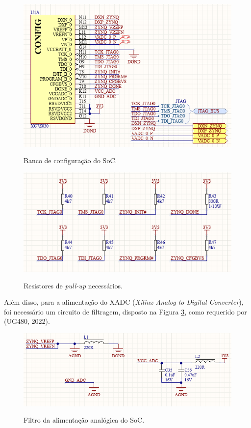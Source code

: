\begin{figure}[H]
    \centering
    \caption{Banco de configuração do SoC.}
    \includegraphics[scale=0.8]{images/zynqconfig.png}
    \label{fig:config}
\end{figure}

\begin{figure}[H]
    \centering
    \caption{Resistores de \textit{pull-up} necessários.}
    \includegraphics[scale=0.8]{images/pullupconfig.png}
    \label{fig:pullupconfig}
\end{figure}

Além disso, para a alimentação do XADC (\textit{Xilinx Analog to Digital Converter}), foi necessário um circuito de filtragem, disposto na Figura \ref{fig:xadcfilter}, como requerido por (UG480, 2022).

\begin{figure}[H]
    \centering
    \caption{Filtro da alimentação analógica do SoC.}
    \includegraphics[scale=0.8]{images/xadcfilter.png}
    \label{fig:xadcfilter}
\end{figure}


